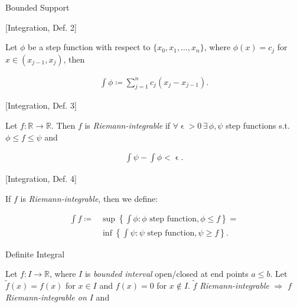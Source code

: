 \documentclass[10pt]{article} %
\renewcommand{\leq}{\leqslant}
\renewcommand{\geq}{\geqslant}
\begin{document}
\begin{multicols}{3}
\begin{definition}{}{Bounded Support}
\end{definition}

\begin{definition}{[Integration, Def. 2]}{}

    Let $\phi$ be a step function with respect to $\{x_0,x_1,\hdots,x_n\}$, where $\phi(x) = c_j$ for $x \in (x_{j-1},x_j)$, then

        \begin{align*}
            \int \phi \coloneqq \sum_{j = 1}^n c_j (x_j - x_{j-1}).
        \end{align*}

\end{definition}

\begin{definition}{[Integration, Def. 3]}{}

    Let $f: \mathbb{R} \to \mathbb{R}$. Then $f$ is \emph{Riemann-integrable} if $\forall \upvarepsilon > 0 \, \exists\, \phi, \psi$ step functions s.t. $\phi \leq f \leq \psi$ and

        \begin{align*}
            \int \psi - \int \phi < \upvarepsilon.
        \end{align*}

\end{definition}

\begin{definition}{[Integration, Def. 4]}{}

    If $f$ is \emph{Riemann-integrable}, then we define:

        \begin{align*}
            \int f \coloneqq &\sup\left\{\int \phi: \phi\,\, \textrm{step function}, \phi \leq f\right\} = \\
            &\inf\left\{\int \psi: \psi\,\, \textrm{step function}, \psi \geq f\right\}.
        \end{align*}

\end{definition}

\begin{definition}{}{Definite Integral}

    Let $f: I \to \mathbb{R}$, where $I$ is \emph{bounded interval} open/closed at end points $a \leq b$. Let $\tilde{f}(x) = f(x)$ for $x \in I$ and $f(x) = 0$ for $x \not\in I$. $\tilde{f}$ \emph{Riemann-integrable} $\Rightarrow$ $f$ \emph{Riemann-integrable on $I$} and


\end{definition}
\end{multicols}
\end{document}
